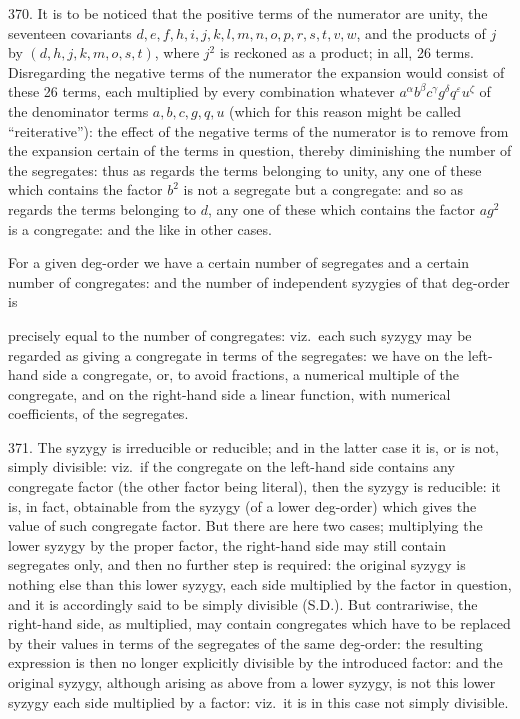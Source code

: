 \documentclass[11pt]{article}
\begin{document}
370. It is to be noticed that the positive terms of the numerator are unity, the seventeen covariants $d, e, f, h, i, j, k, l, m, n, o, p, r, s, t, v, w$, and the products of $j$ by $(d, h, j, k, m, o, s, t)$, where $j^{2}$ is reckoned as a product; in all, 26 terms. Disregarding the negative terms of the numerator the expansion would consist of these 26 terms, each multiplied by every combination whatever $a^{\alpha}b^{\beta}c^{\gamma}g^{\delta}q^{\varepsilon}u^{\zeta}$ of the denominator terms $a, b, c, g, q, u$ (which for this reason might be called ``reiterative''): the effect of the negative terms of the numerator is to remove from the expansion certain of the terms in question, thereby diminishing the number of the segregates: thus as regards the terms belonging to unity, any one of these which contains the factor $b^{2}$ is not a segregate but a congregate: and so as regards the terms belonging to $d$, any one of these which contains the factor $ag^{2}$ is a congregate: and the like in other cases.

For a given deg-order we have a certain number of segregates and a certain number of congregates: and the number of independent syzygies of that deg-order is


\noindent precisely equal to the number of congregates: viz.\ each such syzygy may be regarded as giving a congregate in terms of the segregates: we have on the left-hand side a congregate, or, to avoid fractions, a numerical multiple of the congregate, and on the right-hand side a linear function, with numerical coefficients, of the segregates.

371. The syzygy is irreducible or reducible; and in the latter case it is, or is not, simply divisible: viz.\ if the congregate on the left-hand side contains any congregate factor (the other factor being literal), then the syzygy is reducible: it is, in fact, obtainable from the syzygy (of a lower deg-order) which gives the value of such congregate factor. But there are here two cases; multiplying the lower syzygy by the proper factor, the right-hand side may still contain segregates only, and then no further step is required: the original syzygy is nothing else than this lower syzygy, each side multiplied by the factor in question, and it is accordingly said to be simply divisible (S.D.). But contrariwise, the right-hand side, as multiplied, may contain congregates which have to be replaced by their values in terms of the segregates of the same deg-order: the resulting expression is then no longer explicitly divisible by the introduced factor: and the original syzygy, although arising as above from a lower syzygy, is not this lower syzygy each side multiplied by a factor: viz.\ it is in this case not simply divisible.
\end{document}
